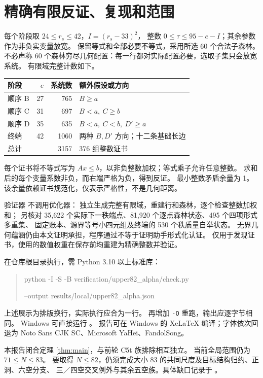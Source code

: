 \documentclass[11pt,a4paper]{article}
\begin{document}
\section{精确有限反证、复现和范围}
每个阶段取 $24\le r_s\le42$，$I=(r_s-33)^2$，
整数 $0\le\tau\le95-e-I$；其余参数作为非负实变量放宽。
保留等式和全部必要不等式，采用所选 60 个合法子森林。
不必声称 60 个森林穷尽几何配置：每一行都对实际配置必要，选取子集只会放宽系统。
有限域完整计数如下。
\begin{center}
\begin{tabular}{lrrl}\toprule
阶段 & $e$ & 系统数 & 额外假设或方向\\\midrule
顺序 B &27&765&$B\ge a$\\
顺序 C &31&697&$B<a,\ C\ge b$\\
顺序 D &35&635&$B<a,\ C<b,\ D'\ge a$\\
终端 &42&1060&两种 $B,D'$ 方向；十二条基础长边\\\midrule
总计 &&3157&376 组整数证书\\\bottomrule
\end{tabular}
\end{center}
每个证书将不等式写为 $Ax\le b$，以非负整数加权；等式乘子允许任意整数。
求和后的每个变量系数非负，而右端严格为负，得到反证。
最小整数矛盾余量为 1。该余量依赖证书规范化，仅表示严格性，不是几何距离。

验证器  不调用优化器：
独立生成完整有限域，重建行和森林，逐个检查整数加权和；
另核对 35,622 个实际下一秩端点、81,920 个逐点森林状态、495 个四项形式多重集、
固定账本、源界等号小四元组及终端的 530 个秩质量自举状态。
无界几何蕴涵仍由本文证明承担，程序通过不等于证明助手形式化认证。
 仅用于发现证书，使用的数值权重在保存前均重建为精确整数并验证。

在仓库根目录执行，需 Python 3.10 以上标准库：
\begin{quote}\small\ttfamily
python -I -S -B verification/upper82\_alpha/check.py\par
\hspace*{1em}--output results/local/upper82\_alpha.json
\end{quote}
上述展示为排版换行，实际执行应合为一行。
再增加 \texttt{-O} 重跑，输出应逐字节相同。
Windows 可直接运行 。
报告可在 Windows 的 XeLaTeX 编译；字体依次回退为 Noto Sans CJK SC、Microsoft YaHei、FandolSong。

本报告闭合定理 \ref{thm:main}，与前轮 C5t 族排除相互独立。
当前全局范围仍为 $71\le N\le83$。
要取得 $N\le82$，仍须完成大小 83 的共同尺度及目标结构归约、正洞、六空分支、
三／四空交叉例外与其余五空族。具体缺口记录于
。
\end{document}

